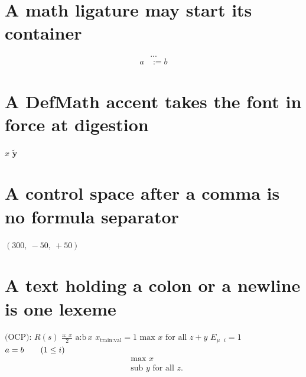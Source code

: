 \documentclass{article}
\begin{document}
\section{A math ligature may start its container}
\[ ... \]
\begin{align*} a &:= b \end{align*}

\section{A DefMath accent takes the font in force at digestion}
{\boldmath $\hat{x}$} $\boldsymbol{\tilde{y}}$


\section{A control space after a comma is no formula separator}
$(300,\ -50,\ +50)$

\section{A text holding a colon or a newline is one lexeme}
$\text{(OCP): }R(s)$ $\frac{\text{a: }x}{2}$ $\text{a:b}\,x$ $x_{\text{train:val}}=1$
$\text{max $x$ for
all $z$}+y$ $E_{\mu\text{ }i}=1$ $a=b\text{\qquad}(1\le i)$
\[ \begin{split}&\text{max $x$}\\&\text{sub $y$ for
all $z$}.\end{split} \]
\end{document}
